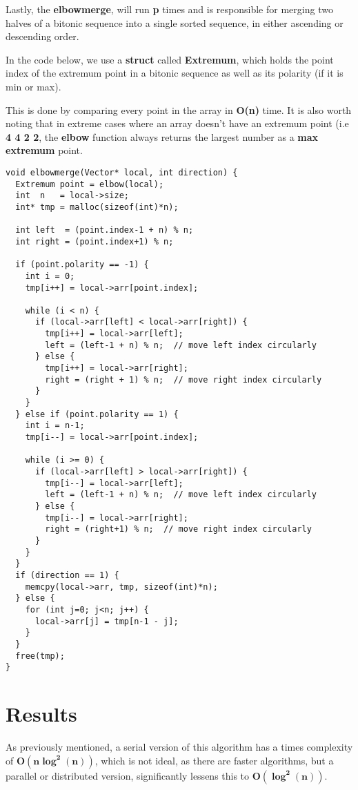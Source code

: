 \documentclass[12pt]{report}
\begin{document}
        Lastly, the \textbf{elbowmerge}, will run \textbf{p} times and is responsible
        for merging two halves of a bitonic sequence into a single sorted sequence, in either ascending or
        \vspace{0.5cm}
        descending order.

        In the code below, we use a \textbf{struct} called \textbf{Extremum}, which holds the point index of the
        \vspace{0.5cm}
        extremum point in a bitonic sequence as well as its polarity (if it is min or max).

        This is done by comparing every point in the array in \textbf{O(n)} time. It is also worth noting that in
        extreme cases where an array doesn't have an extremum point (i.e \textbf{4 4 2 2}, the \textbf{elbow} function
        always returns the largest number as a \textbf{max extremum} point.
        \newpage
        \begin{lstlisting}[style=cstyle]
void elbowmerge(Vector* local, int direction) {
  Extremum point = elbow(local);
  int  n   = local->size;
  int* tmp = malloc(sizeof(int)*n);

  int left  = (point.index-1 + n) % n;
  int right = (point.index+1) % n;

  if (point.polarity == -1) {  
    int i = 0;
    tmp[i++] = local->arr[point.index];  

    while (i < n) {
      if (local->arr[left] < local->arr[right]) {
        tmp[i++] = local->arr[left];
        left = (left-1 + n) % n;  // move left index circularly
      } else {
        tmp[i++] = local->arr[right];
        right = (right + 1) % n;  // move right index circularly
      }
    }
  } else if (point.polarity == 1) {  
    int i = n-1;
    tmp[i--] = local->arr[point.index];  

    while (i >= 0) {
      if (local->arr[left] > local->arr[right]) {
        tmp[i--] = local->arr[left];
        left = (left-1 + n) % n;  // move left index circularly
      } else {
        tmp[i--] = local->arr[right];
        right = (right+1) % n;  // move right index circularly
      }
    }
  }
  if (direction == 1) {
    memcpy(local->arr, tmp, sizeof(int)*n);
  } else {
    for (int j=0; j<n; j++) {
      local->arr[j] = tmp[n-1 - j];
    }
  }
  free(tmp);
}
        \end{lstlisting}

\chapter{Results}
    As previously mentioned, a serial version of this algorithm has a times complexity of \(\boldsymbol{O(n \log^2(n))}\), which
    is not ideal, as there are faster algorithms, but a parallel or distributed version, significantly lessens this to 
    \(\boldsymbol{O(\log^2(n))}\).
\end{document}
